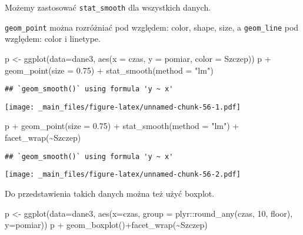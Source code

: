 \documentclass[
]{book}
\newenvironment{Shaded}{\begin{snugshade}}{\end{snugshade}}
\newcommand{\AttributeTok}[1]{\textcolor[rgb]{0.77,0.63,0.00}{#1}}
\newcommand{\DecValTok}[1]{\textcolor[rgb]{0.00,0.00,0.81}{#1}}
\newcommand{\FloatTok}[1]{\textcolor[rgb]{0.00,0.00,0.81}{#1}}
\newcommand{\FunctionTok}[1]{\textcolor[rgb]{0.00,0.00,0.00}{#1}}
\newcommand{\NormalTok}[1]{#1}
\newcommand{\OtherTok}[1]{\textcolor[rgb]{0.56,0.35,0.01}{#1}}
\newcommand{\SpecialCharTok}[1]{\textcolor[rgb]{0.00,0.00,0.00}{#1}}
\newcommand{\StringTok}[1]{\textcolor[rgb]{0.31,0.60,0.02}{#1}}
\begin{document}
Możemy zastosować \texttt{stat\_smooth} dla wszystkich danych.

\texttt{geom\_point} można rozróżniać pod względem: color, shape, size, a \texttt{geom\_line} pod względem: color i linetype.

\begin{Shaded}
\begin{Highlighting}[]
\NormalTok{p }\OtherTok{\textless{}{-}} \FunctionTok{ggplot}\NormalTok{(}\AttributeTok{data=}\NormalTok{dane3, }\FunctionTok{aes}\NormalTok{(}\AttributeTok{x =}\NormalTok{ czas, }\AttributeTok{y =}\NormalTok{ pomiar, }\AttributeTok{color =}\NormalTok{ Szczep))}
\NormalTok{p }\SpecialCharTok{+} \FunctionTok{geom\_point}\NormalTok{(}\AttributeTok{size =} \FloatTok{0.75}\NormalTok{) }\SpecialCharTok{+} \FunctionTok{stat\_smooth}\NormalTok{(}\AttributeTok{method =} \StringTok{"lm"}\NormalTok{)}
\end{Highlighting}
\end{Shaded}

\begin{verbatim}
## `geom_smooth()` using formula 'y ~ x'
\end{verbatim}

\texttt{[image: \_main\_files/figure-latex/unnamed-chunk-56-1.pdf]}

\begin{Shaded}
\begin{Highlighting}[]
\NormalTok{p }\SpecialCharTok{+} \FunctionTok{geom\_point}\NormalTok{(}\AttributeTok{size =} \FloatTok{0.75}\NormalTok{) }\SpecialCharTok{+} \FunctionTok{stat\_smooth}\NormalTok{(}\AttributeTok{method =} \StringTok{"lm"}\NormalTok{) }\SpecialCharTok{+} \FunctionTok{facet\_wrap}\NormalTok{(}\SpecialCharTok{\textasciitilde{}}\NormalTok{Szczep)}
\end{Highlighting}
\end{Shaded}

\begin{verbatim}
## `geom_smooth()` using formula 'y ~ x'
\end{verbatim}

\texttt{[image: \_main\_files/figure-latex/unnamed-chunk-56-2.pdf]}

Do przedstawienia takich danych można też użyć boxplot.

\begin{Shaded}
\begin{Highlighting}[]
\NormalTok{p }\OtherTok{\textless{}{-}} \FunctionTok{ggplot}\NormalTok{(}\AttributeTok{data=}\NormalTok{dane3, }\FunctionTok{aes}\NormalTok{(}\AttributeTok{x=}\NormalTok{czas, }\AttributeTok{group =}\NormalTok{ plyr}\SpecialCharTok{::}\FunctionTok{round\_any}\NormalTok{(czas, }\DecValTok{10}\NormalTok{, floor), }\AttributeTok{y=}\NormalTok{pomiar))}
\NormalTok{p }\SpecialCharTok{+} \FunctionTok{geom\_boxplot}\NormalTok{()}\SpecialCharTok{+}\FunctionTok{facet\_wrap}\NormalTok{(}\SpecialCharTok{\textasciitilde{}}\NormalTok{Szczep)}
\end{Highlighting}
\end{Shaded}
\end{document}
